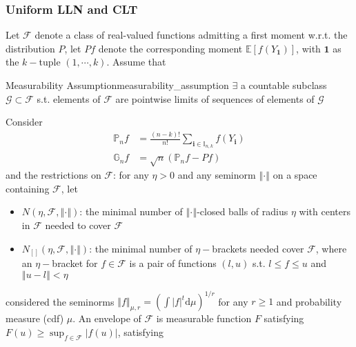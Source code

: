 \documentclass[twoside]{article}
\begin{document}
\subsubsection{Uniform LLN and CLT}
Let $\mathcal{F}$ denote a class of real-valued functions admitting a first moment w.r.t. the distribution $P$, let $Pf$ denote the corresponding moment $\mathbb{E}\left[f(Y_{\mathbf{1}})\right]$, with $\mathbf{1}$ as the $k-$tuple $(1,\cdots,k)$. Assume that
\begin{assumption}{Measurability Assumption}{measurability_assumption}
    $\exists$ a countable subclass $\mathcal{G}\subset \mathcal{F}$ s.t. elements of $\mathcal{F}$ are pointwise limits of sequences of elements of $\mathcal{G}$
\end{assumption}
Consider
\begin{align*}
    \mathbb{P}_n f &= \frac{(n-k)!}{n!} \sum_{\mathbf{i}\in \mathbb{I}_{n,k}}f(Y_{\mathbf{i}}) \\
    \mathbb{G}_n f &= \sqrt{n}\left(\mathbb{P}_n f - Pf\right)
\end{align*}
and the restrictions on $\mathcal{F}$: for any $\eta>0$ and any seminorm $\left\Vert \cdot \right\Vert$ on a space containing $\mathcal{F}$, let
\begin{itemize}
    \item $N\left(\eta, \mathcal{F}, \left\Vert \cdot \right\Vert\right)$: the minimal number of $\left\Vert \cdot \right\Vert$-closed balls of radius $\eta$ with centers in $\mathcal{F}$ needed to cover $\mathcal{F}$
    \item $N_{[]}\left(\eta, \mathcal{F}, \left\Vert \cdot \right\Vert\right)$: the minimal number of $\eta-$brackets needed cover $\mathcal{F}$, where an $\eta-$bracket for $f\in\mathcal{F}$ is a pair of functions $\left(l,u\right)$ s.t. $l\leq f\leq u$ and $\left\Vert u-l \right\Vert<\eta$
\end{itemize}
\citet{davezies2021empirical} considered the seminorms $\left\Vert f \right\Vert _{\mu,r}=\left(\int \left\vert f \right\vert^t \mathrm{d}\mu\right)^{1/r}$ for any $r\geq 1$ and probability measure (cdf) $\mu$. An envelope of $\mathcal{F}$ is measurable function $F$ satisfying $F(u) \geq \sup_{f\in\mathcal{F}}\left\vert f(u) \right\vert$, satisfying 
\end{document}
